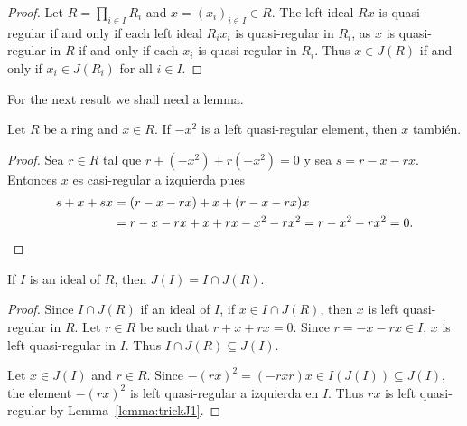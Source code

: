 \begin{proof}
	Let $R=\prod_{i\in I}R_i$ and $x=(x_i)_{i\in I}\in R$.  The left ideal 
    $Rx$ is quasi-regular if and only if each left ideal $R_ix_i$
	is quasi-regular in $R_i$, as $x$ is quasi-regular in $R$ if and only if each 
	$x_i$ is quasi-regular in $R_i$. Thus $x\in J(R)$ if and only if $x_i\in
	J(R_i)$ for all $i\in I$.
\end{proof}

For the next result we shall need a lemma.

\begin{lemma}
	\label{lemma:trickJ1}
	Let $R$ be a ring and $x\in R$. 
	If $-x^2$ is a left quasi-regular element, then $x$ también. 
\end{lemma}

\begin{proof}
	Sea $r\in R$ tal que $r+(-x^2)+r(-x^2)=0$ y sea $s=r-x-rx$. Entonces $x$ es
	casi-regular a izquierda pues 
	\begin{align*}
		s+x+sx&=(r-x-rx)+x+(r-x-rx)x\\
		&=r-x-rx+x+rx-x^2-rx^2=r-x^2-rx^2=0.\qedhere 
\end{align*}
\end{proof}

%

\begin{proposition}
	\label{proposition:J(I)}
	If $I$ is an ideal of $R$, then $J(I)=I\cap J(R)$. 
\end{proposition}

\begin{proof}
	Since $I\cap J(R)$ if an ideal of $I$, if $x\in I\cap J(R)$, then $x$ is
	left quasi-regular in $R$. Let $r\in R$ be such that $r+x+rx=0$. 
	Since $r=-x-rx\in I$, $x$ is left quasi-regular 
	in $I$. Thus $I\cap J(R)\subseteq J(I)$. 

	Let $x\in J(I)$ and $r\in R$. Since $-(rx)^2=(-rxr)x\in
	I(J(I))\subseteq J(I)$, the element $-(rx)^2$ is left quasi-regular a izquierda
	en $I$. Thus $rx$ is left quasi-regular by
	Lemma~\ref{lemma:trickJ1}.
\end{proof}

